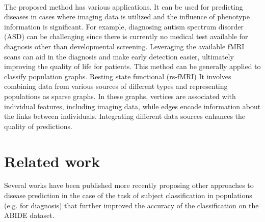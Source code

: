 \documentclass[sigconf]{acmart}
\begin{document}
\paragraph{} The proposed method has various applications. 
It can be used for predicting diseases in cases where imaging data is utilized and the influence of phenotype information
is significant. For example, diagnosing autism spectrum disorder (ASD) can be challenging since there is currently 
no medical test available for diagnosis other than developmental screening. Leveraging the available fMRI scans can 
aid in the diagnosis and make early detection easier, ultimately improving the quality of life for patients. 
This method can be generally applied to classify population graphs. 
Resting state functional (rs-fMRI) %
It involves combining data from various sources of different types and representing populations as sparse graphs. 
In these graphs, vertices are associated with individual features, including imaging data, while edges encode information
about the links between individuals. 
Integrating different data sources enhances the quality of predictions.

\section{Related work}
Several works have been published more recently proposing other approaches to disease prediction in the case of the task 
of subject classification in populations (e.g. for diagnosis) that further improved the accuracy of the classification on the ABIDE dataset. 



\end{document}
